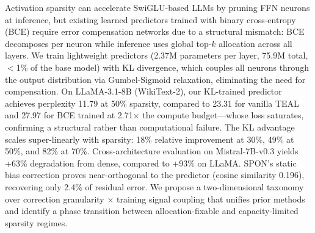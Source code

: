 Activation sparsity can accelerate SwiGLU-based LLMs by pruning FFN neurons at inference, but existing learned predictors trained with binary cross-entropy (BCE) require error compensation networks due to a structural mismatch: BCE decomposes per neuron while inference uses global top-$k$ allocation across all layers.
We train lightweight predictors (2.37M parameters per layer, 75.9M total, $<$1\% of the base model) with KL divergence, which couples all neurons through the output distribution via Gumbel-Sigmoid relaxation, eliminating the need for compensation.
On LLaMA-3.1-8B (WikiText-2), our KL-trained predictor achieves perplexity 11.79 at 50\% sparsity, compared to 23.31 for vanilla TEAL and 27.97 for BCE trained at 2.71$\times$ the compute budget---whose loss saturates, confirming a structural rather than computational failure.
The KL advantage scales super-linearly with sparsity: 18\% relative improvement at 30\%, 49\% at 50\%, and 82\% at 70\%.
Cross-architecture evaluation on Mistral-7B-v0.3 yields +63\% degradation from dense, compared to +93\% on LLaMA.
SPON's static bias correction proves near-orthogonal to the predictor (cosine similarity 0.196), recovering only 2.4\% of residual error.
We propose a two-dimensional taxonomy over correction granularity $\times$ training signal coupling that unifies prior methods and identify a phase transition between allocation-fixable and capacity-limited sparsity regimes.